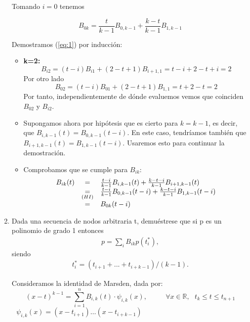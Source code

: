 \documentclass[12pt,a4paper]{article}
\begin{document}
\begin{enumerate}
  Tomando $i=0$ tenemos

  \begin{equation}
    B_{0k}=\frac{t}{k-1}B_{0,k-1}+\frac{k-t}{k-1}B_{1,k-1}
  \end{equation}
  
  Demostramos (\ref{eq:1}) por inducción:
  \begin{itemize}
  \item \textbf{k=2:}
    \begin{equation*}
      B_{i2}=(t-i)B_{i1}+(2-t+1)B_{i+1,1}=t-i+2-t+i=2
    \end{equation*}
    Por otro lado
    \begin{equation*}
      B_{02}=(t-i)B_{01}+(2-t+1)B_{1,1}=t+2-t=2
    \end{equation*}
    Por tanto, independientemente de dónde evaluemos vemos que
    coinciden $B_{02}$ y $B_{i2}$.
  \item Supongamos ahora por hipótesis que es cierto para $k=k-1$, es
    decir, que $B_{i,k-1}(t)=B_{0,k-1}(t-i)$. En este caso, tendríamos
    también que $B_{i+1,k-1}(t)=B_{1,k-1}(t-i)$. Usaremos esto para
    continuar la demostración.
    
  \item Comprobamos que se cumple para \textbf{$B_{ik}$}:
    \begin{equation}
      \begin{array}{l c l}
        B_{ik}(t)&=&\frac{t-i}{k-1}B_{i,k-1}(t)+\frac{k-t-i}{k-1}B_{i+1,k-1}(t) \\
                 &\underset{(HI)}{=}&\frac{t-i}{k-1}B_{0,k-1}(t-i)+\frac{k-t-i}{k-1}B_{1,k-1}(t-i) \\
                 &=&B_{0k}(t-i)
      \end{array}
    \end{equation}
    
  \end{itemize}
  \newpage{}
\item Dada una secuencia de nodos arbitraria t, demuéstrese
  que si p es un polinomio de grado 1 entonces
  \begin{align*}
    p = \sum_{i}B_{ik}p(t_{i}^{*}),
  \end{align*}
  siendo
  \begin{align*}
    t_{i}^{*}=(t_{i+1}+...+t_{i+k-1})/(k-1).
  \end{align*}

  Consideramos la identidad de Marsden, dada por:
  $$(x-t)^{k-1}=\sum\limits_{i=1}^{n}B_{i,k}(t)\cdot\psi_{i,k}(x),\,\,\,\,\,\,\,\,\,\,\,\,\,\,\,\, \forall x\in\mathbb{R},\,\,\,\, t_k\le t \le t_{n+1}$$
  $\,\,\,\,\psi_{i,k}(x)=(x-t_{i+1})\dots (x-t_{i+k-1})$


\end{enumerate}
\end{document}
